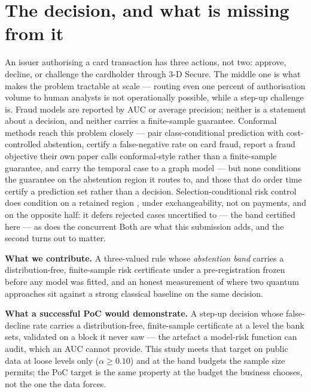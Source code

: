 \section{The decision, and what is missing from it}

An issuer authorising a card transaction has three actions, not two: approve, decline, or
challenge the cardholder through 3-D Secure. The middle one is what makes the problem tractable
at scale --- routing even one percent of authorisation volume to human analysts is not
operationally possible, while a step-up challenge is. Fraud models are reported by AUC or
average precision; neither is a statement about a decision, and neither carries a finite-sample
guarantee. Conformal methods reach this problem closely ---  pair
class-conditional prediction with cost-controlled abstention,  certify a
false-negative rate on card fraud,  report a fraud objective their
own paper calls conformal-style rather than a finite-sample guarantee, and
 carry the temporal case to a graph model --- but none conditions the
guarantee on the abstention region it routes to, and those that do order time certify a
prediction set rather than a decision. Selection-conditional risk control does condition on a
retained region , under exchangeability, not on payments, and on
the opposite half: it defers rejected cases uncertified to  --- the
band certified here --- as does the concurrent 
Both are what this submission adds, and the second turns out to matter.

\textbf{What we contribute.} A three-valued rule whose \emph{abstention band} carries a
distribution-free, finite-sample risk certificate under a pre-registration frozen before any
model was fitted, and an honest measurement of where two quantum approaches sit against a strong
classical baseline on the same decision.

\textbf{What a successful PoC would demonstrate.} A step-up decision whose false-decline rate
carries a distribution-free, finite-sample certificate at a level the bank sets, validated on a
block it never saw --- the artefact a model-risk function can audit, which an AUC cannot
provide. This study meets that target on public data at loose levels only
($\alpha \ge 0.10$) and at the band budgets the sample size permits; the PoC target is the same
property at the budget the business chooses, not the one the data forces.

